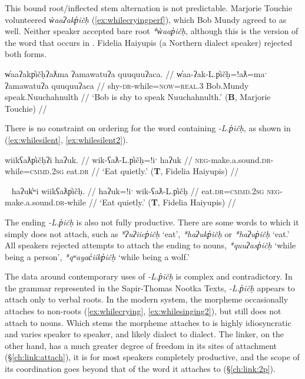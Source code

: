 This bound root/inflected stem alternation is not predictable. Marjorie Touchie volunteered \textit{w̓aaʔakp̓ičḥ} (\ref{ex:whilecryingperf}), which Bob Mundy agreed to as well. Neither speaker accepted bare root \textit{*w̓aap̓ičḥ}, although this is the version of the word that occurs in \citet{sapir1939}. Fidelia Haiyupis (a Northern dialect speaker) rejected both forms.

\ex \label{ex:whilecryingperf}
\begingl
\glpreamble w̓aaʔakp̓ičḥʔaƛma ʔamawatuʔa quuquuʔaca. //
\gla w̓aa-ʔak-L.p̓ičḥ=!aƛ=maˑ ʔamawatuʔa quuquuʔaca //
\glb shy-\textsc{dr}-while=\textsc{now}=\textsc{real.3} Bob.Mundy speak.Nuuchahnulth //
\glft `Bob is shy to speak Nuuchahnulth.' (\textbf{B}, Marjorie Touchie) //
\endgl
\xe

There is no constraint on ordering for the word containing \textit{-L.p̓ičḥ}, as shown in (\ref{ex:whilesilent}, \ref{ex:whilesilent2}).

\ex \label{ex:whilesilent}
\begingl
\glpreamble wiikʕaƛp̓ičḥʔi haʔuk. //
\gla wik-ʕaƛ-L.p̓ičḥ=!iˑ haʔuk //
\glb \textsc{neg}-make.a.sound.\textsc{dr}-while=\textsc{cmmd.2sg} eat.\textsc{dr} //
\glft `Eat quietly.' (\textbf{T}, Fidelia Haiyupis) //
\endgl
\xe

\ex~ \label{ex:whilesilent2}
\begingl
\glpreamble haʔuk̓ʷi wiikʕaƛp̓ičḥ. //
\gla haʔuk=!iˑ wik-ʕaƛ-L.p̓ičḥ //
\glb eat.\textsc{dr}=\textsc{cmmd.2sg} \textsc{neg}-make.a.sound.\textsc{dr}-while //
\glft `Eat quietly.' (\textbf{T}, Fidelia Haiyupis) //
\endgl
\xe

The ending \textit{-L.p̓ičḥ} is also not fully productive. There are some words to which it simply does not attach, such as \textit{*ʔuʔiicp̓ičḥ} `eat', \textit{*haʔukp̓ičḥ} or \textit{*haʔup̓ičḥ} `eat.' All speakers rejected attempts to attach the ending to nouns, \textit{*quuʔasp̓ičḥ} `while being a person', \textit{*qʷayac̓iikp̓ičḥ} `while being a wolf.'

The data around contemporary uses of \textit{-L.p̓ičḥ} is complex and contradictory. In the grammar represented in the Sapir-Thomas Nootka Texts, \textit{-L.p̓ičḥ} appears to attach only to verbal roots. In the modern system, the morpheme occasionally attaches to non-roots (\ref{ex:whilecrying}, \ref{ex:whilesinging2}), but still does not attach to nouns. Which stems the morpheme attaches to is highly idiosyncratic and varies speaker to speaker, and likely dialect to dialect. The linker, on the other hand, has a much greater degree of freedom in its sites of attachment (\S\ref{ch:link:attach}), it is for most speakers completely productive, and the scope of its coordination goes beyond that of the word it attaches to (\S\ref{ch:link:2p}).

